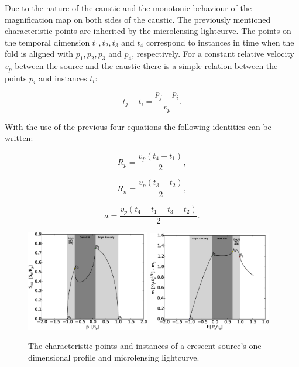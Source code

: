 Due to the nature of the caustic and the monotonic behaviour of the magnification map on both sides of the caustic. The previously mentioned characteristic points are inherited by the microlensing lightcurve. The points on the temporal dimension $t_1, t_2, t_3$ and $t_4$ correspond to instances in time when the fold is aligned with $p_1, p_2, p_3$ and $p_4$, respectively. For a constant relative velocity $v_p$ between the source and the caustic there is a simple relation between the points $p_i$ and instances $t_i$:

\begin{equation}
	t_j - t_i = \frac{p_j - p_i}{v_p}.
\end{equation}

With the use of the previous four equations the following identities can be written:

\begin{equation}
	R_p = \frac{v_p \left( t_4 -t_1 \right)}{2}, 
\end{equation}

\begin{equation}
        R_n = \frac{v_p \left( t_3 -t_2 \right)}{2}, 
\end{equation}

\begin{equation}
        a = \frac{v_p \left( t_4 +t_1 - t_3 - t_2 \right)}{2}. 
\end{equation}



\begin{figure}
\centering
	\includegraphics[width = 0.48\textwidth]{plots/ch_points.eps}
        \includegraphics[width = 0.48\textwidth]{plots/ch_instances.eps}
\caption{\label{fig:char_points} The characteristic points and instances of a crescent source's one dimensional profile and microlensing lightcurve. }
\end{figure}


